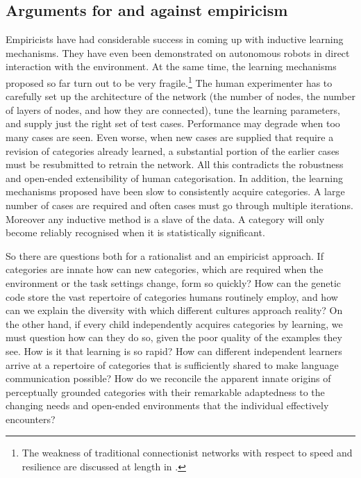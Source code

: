 \subsection{Arguments for and against empiricism}

Empiricists have had considerable
success in coming up with inductive learning mechanisms. 
They have even been demonstrated on autonomous robots 
in direct interaction with the environment.
At the same time, the learning mechanisms proposed so far turn out
to be very fragile.\footnote{
The weakness of traditional connectionist networks
with respect to speed and resilience
are discussed at length in \cite{Quartz:1997}.}
The human experimenter has to carefully 
set up the architecture of the network (the number of
nodes, the number of layers of nodes, and how they are
connected), tune the learning
parameters, and supply just the right set of test cases. 
Performance may degrade when too many cases are seen. 
Even worse, when new cases are supplied that require
a revision of categories already learned, a substantial
portion of the earlier cases must be resubmitted to 
retrain the network. All this contradicts
the robustness and open-ended extensibility
of human categorisation. In addition, 
the learning mechanisms proposed have been
slow to consistently acquire categories. A large number of cases
are required and often 
cases must go through multiple iterations. Moreover 
any inductive method is a slave of
the data. A category will only become reliably recognised
when it is statistically significant. 

So there are questions both for a rationalist and an 
empiricist approach. If categories are innate how can
new categories, which are required when the environment
or the task settings change, form so quickly?
How can the genetic code store the vast repertoire 
of categories humans routinely 
employ, and how can we explain the diversity with which different
cultures approach reality? On the other hand, if every 
child independently acquires categories by learning, we 
must question how 
can they do so, given the poor quality of the examples 
they see. How is it that learning is so rapid? How can different
independent learners arrive at a repertoire of categories
that is sufficiently shared to make language communication
possible? How do we reconcile the apparent 
innate origins of perceptually 
grounded categories with their remarkable adaptedness to the 
changing needs and open-ended environments that the individual
effectively encounters? 

